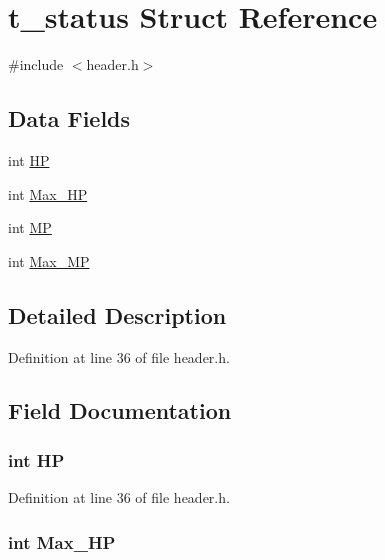 \hypertarget{structt__status}{\section{t\-\_\-status Struct Reference}
\label{structt__status}
}


{\ttfamily \#include $<$header.\-h$>$}

\subsection*{Data Fields}
\begin{DoxyCompactItemize}
\item 
int \hyperlink{structt__status_a58ca25ca6c9448a364b84539e42f1fa6}{H\-P}
\item 
int \hyperlink{structt__status_a3ae8966f5c827b3c74072acda8de72af}{Max\-\_\-\-H\-P}
\item 
int \hyperlink{structt__status_a30fc75b90111fc791752dd1add6ed991}{M\-P}
\item 
int \hyperlink{structt__status_a5e48a681ff3d92aaa0e643fbc32ab2f7}{Max\-\_\-\-M\-P}
\end{DoxyCompactItemize}


\subsection{Detailed Description}


Definition at line 36 of file header.\-h.



\subsection{Field Documentation}
\hypertarget{structt__status_a58ca25ca6c9448a364b84539e42f1fa6}{
\subsubsection[{H\-P}]{\setlength{\rightskip}{0pt plus 5cm}int H\-P}}\label{structt__status_a58ca25ca6c9448a364b84539e42f1fa6}


Definition at line 36 of file header.\-h.

\hypertarget{structt__status_a3ae8966f5c827b3c74072acda8de72af}{
\subsubsection[{Max\-\_\-\-H\-P}]{\setlength{\rightskip}{0pt plus 5cm}int Max\-\_\-\-H\-P}}\label{structt__status_a3ae8966f5c827b3c74072acda8de72af}


